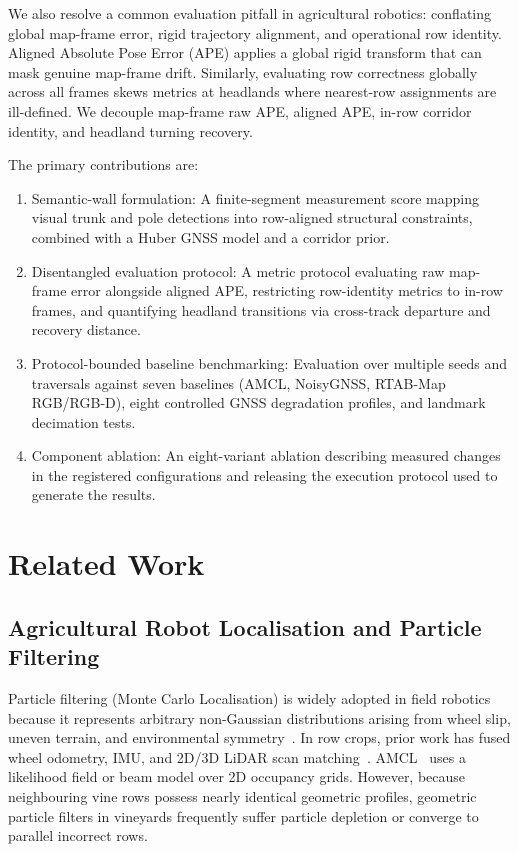 \documentclass[letterpaper, 10 pt, conference]{ieeeconf}
\begin{document}
We also resolve a common evaluation pitfall in agricultural robotics: conflating global map-frame error, rigid trajectory alignment, and operational row identity. Aligned Absolute Pose Error (APE) applies a global rigid transform that can mask genuine map-frame drift. Similarly, evaluating row correctness globally across all frames skews metrics at headlands where nearest-row assignments are ill-defined. We decouple map-frame raw APE, aligned APE, in-row corridor identity, and headland turning recovery.

The primary contributions are:
\begin{enumerate}
  \item Semantic-wall formulation: A finite-segment measurement score mapping visual trunk and pole detections into row-aligned structural constraints, combined with a Huber GNSS model and a corridor prior.
  \item Disentangled evaluation protocol: A metric protocol evaluating raw map-frame error alongside aligned APE, restricting row-identity metrics to in-row frames, and quantifying headland transitions via cross-track departure and recovery distance.
  \item Protocol-bounded baseline benchmarking: Evaluation over multiple seeds and traversals against seven baselines (AMCL, NoisyGNSS, RTAB-Map RGB/RGB-D), eight controlled GNSS degradation profiles, and landmark decimation tests.
  \item Component ablation: An eight-variant ablation describing measured changes in the registered configurations and releasing the execution protocol used to generate the results.
\end{enumerate}

\section{Related Work}
\label{sec:related}

\subsection{Agricultural Robot Localisation and Particle Filtering}
Particle filtering (Monte Carlo Localisation) is widely adopted in field robotics because it represents arbitrary non-Gaussian distributions arising from wheel slip, uneven terrain, and environmental symmetry~\cite{amcl,aguiar2022localization,blok2019robot}. In row crops, prior work has fused wheel odometry, IMU, and 2D/3D LiDAR scan matching~\cite{yilmaz2019ras,nehme2021lidar}. AMCL~\cite{amcl} uses a likelihood field or beam model over 2D occupancy grids. However, because neighbouring vine rows possess nearly identical geometric profiles, geometric particle filters in vineyards frequently suffer particle depletion or converge to parallel incorrect rows.
\end{document}
